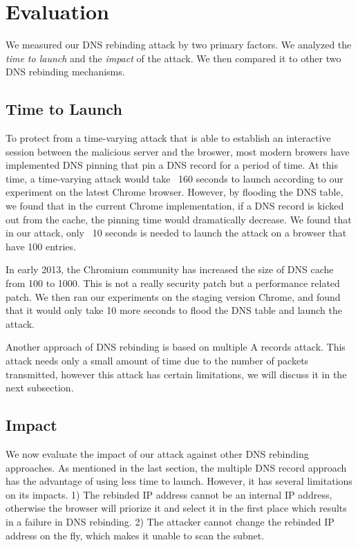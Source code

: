 \section{Evaluation}
\label{sec:eval}
We measured our DNS rebinding attack by two primary factors. We analyzed the \emph{time to launch} and the \emph{impact} of the attack. We then compared it to other two DNS rebinding mechanisms. 

\subsection{Time to Launch}
To protect from a time-varying attack that is able to establish an interactive session between the malicious server and the broswer, most modern browers have implemented DNS pinning that pin a DNS record for a period of time. At this time, a time-varying attack would take ~160 seconds to launch according to our experiment on the latest Chrome browser. However, by flooding the DNS table, we found that in the current Chrome implementation, if a DNS record is kicked out from the cache, the pinning time would dramatically decrease. We found that in our attack, only ~10 seconds is needed to launch the attack on a browser that have 100 entries. 

In early 2013, the Chromium community has increased the size of DNS cache from 100 to 1000. This is not a really security patch but a performance related patch. We then ran our experiments on the staging version Chrome, and found that it would only take 10 more seconds to flood the DNS table and launch the attack. 

Another approach of DNS rebinding is based on multiple A records attack. This attack needs only a small amount of time due to the number of packets transmitted, however this attack has certain limitations, we will discuss it in the next subsection.

\subsection{Impact}
We now evaluate the impact of our attack against other DNS rebinding approaches. As mentioned in the last section, the multiple DNS record approach has the advantage of using less time to launch. However, it has several limitations on its impacts. 1) The rebinded IP address cannot be an internal IP address, otherwise the browser will priorize it and select it in the first place which results in a failure in DNS rebinding. 2) The attacker cannot change the rebinded IP address on the fly, which makes it unable to scan the subnet. 

